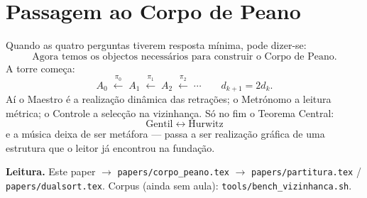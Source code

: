 \documentclass[11pt,a4paper]{article}
\newcommand{\code}[1]{\texttt{\small #1}}
\begin{document}
\section{Passagem ao Corpo de Peano}

Quando as quatro perguntas tiverem resposta mínima, pode dizer-se:
\[
\boxed{
\text{Agora temos os objectos necessários para construir o Corpo de Peano.}
}
\]
A torre começa:
\[
A_0
\;\xleftarrow{\pi_0}\;
A_1
\;\xleftarrow{\pi_1}\;
A_2
\;\xleftarrow{\pi_2}\;
\cdots
\qquad
d_{k+1}=2d_k.
\]
Aí o Maestro é a realização dinâmica das retrações; o Metrónomo a
leitura métrica; o Controle a selecção na vizinhança. Só no fim o
Teorema Central:
\[
\boxed{\text{Gentil}\;\longleftrightarrow\;\text{Hurwitz}}
\]
e a música deixa de ser metáfora --- passa a ser realização gráfica de
uma estrutura que o leitor já encontrou na fundação.

\bigskip
\noindent\textbf{Leitura.} Este paper $\to$
\code{papers/corpo\_peano.tex} $\to$
\code{papers/partitura.tex} / \code{papers/dualsort.tex}.
Corpus (ainda sem aula): \code{tools/bench\_vizinhanca.sh}.
\end{document}
